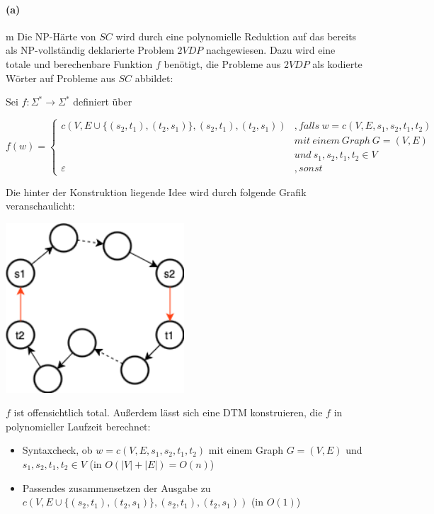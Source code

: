 
\paragraph{(a)}m
	Die NP-Härte von $SC$ wird durch eine polynomielle Reduktion auf das bereits als NP-vollständig deklarierte Problem $2VDP$ nachgewiesen. Dazu wird eine totale und berechenbare Funktion $f$ benötigt, die Probleme aus $2VDP$ als kodierte Wörter auf Probleme aus $SC$ abbildet:

	Sei $f:\Sigma^*\rightarrow \Sigma^*$ definiert über

	$f(w)=\begin{cases}
		c(V,E\cup \{(s_2,t_1),(t_2,s_1)\},(s_2,t_1),(t_2,s_1))&, falls\ w=c(V,E,s_1,s_2,t_1,t_2)\\
		&mit\ einem\ Graph\ G=(V,E)\\
		&und\ s_1,s_2,t_1,t_2 \in V\\
		\varepsilon &, sonst
	\end{cases}$

	Die hinter der Konstruktion liegende Idee wird durch folgende Grafik veranschaulicht:

	\includegraphics[width=0.5\textwidth]{./sol/thinf/f23t1/skizze_reduktion.png}
	
	$f$ ist offensichtlich total. Außerdem lässt sich eine DTM konstruieren, die $f$ in polynomieller Laufzeit berechnet:
	\begin{itemize}
		\item Syntaxcheck, ob $w=c(V,E,s_1,s_2,t_1,t_2)$ mit einem Graph $G=(V,E)$ und $s_1,s_2,t_1,t_2 \in V$ (in $O(|V|+|E|)=O(n)$)
		\item Passendes zusammensetzen der Ausgabe zu $c(V,E\cup \{(s_2,t_1),(t_2,s_1)\},(s_2,t_1),(t_2,s_1))$ (in $O(1)$)
	\end{itemize}

